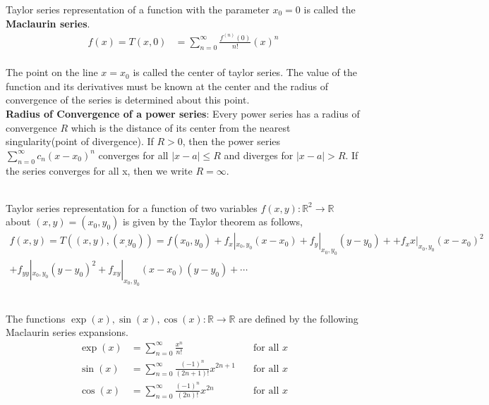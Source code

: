 \documentclass[12pt]{article}
\begin{document}
\noindent
Taylor series representation of a function with the parameter $ x_0 = 0 $ is called the \textbf{Maclaurin series}.
\begin{align}
	f(x) = T(x,0) &= \sum _{n=0}^{\infty }{\frac {f^{(n)}(0)}{n!}}(x)^{n} 
\end{align}
\\
The point on the line $ x = x_0 $ is called the center of taylor series. The value of the function and its derivatives must be known at the center and the radius of convergence of the series is determined about this point.\\[3mm]
\noindent
\textbf{Radius of Convergence of a power series}: Every power series has a radius of convergence $R$ which is the distance of its center from the nearest singularity(point of divergence).
If $R > 0$, then the power series $ \sum_{n=0}^{\infty} {c_n (x-x_0)^n}$ converges for all $ |x-a|\leq R $ and diverges for $ |x-a| > R $. If the series converges for all x, then we write $ R=\infty $. 

\noindent \\
Taylor series representation for a function of two variables $ f(x,y): \mathbb{R}^2 \rightarrow \mathbb{R} $ about $(x,y) = (x_0,y_0)$ is given by the Taylor theorem as follows,
\begin{align}
	f(x,y) = T((x,y),(x_,y_0)) = f(x_0,y_0) + f_x|_{x_0,y_0}(x-x_0) + f_y|_{x_0,y_0}(y-y_0) + + f_xx|_{x_0,y_0}(x-x_0)^2 \nonumber\\ + f_{yy}|_{x_0,y_0}(y-y_0)^2 + f_{xy}|_{x_0,y_0}(x-x_0)(y-y_0) + \cdots
\end{align}

\noindent \\
The functions $ \exp(x),\sin(x),\cos(x): \mathbb{R} \rightarrow \mathbb{R}$ are defined by the following Maclaurin series expansions.
\begin{align}
	\exp(x) &=\sum _{n=0}^{\infty }{\frac {x^n}{n!}} &\quad {\text{for all }}x\\
	\sin(x) &=\sum _{n=0}^{\infty }{\frac {(-1)^{n}}{(2n+1)!}}x^{2n+1} &\quad {\text{for all }}x\\
	\cos(x) &=\sum _{n=0}^{\infty }{\frac {(-1)^{n}}{(2n)!}}x^{2n} &\quad {\text{for all }}x
\end{align}
\end{document}
